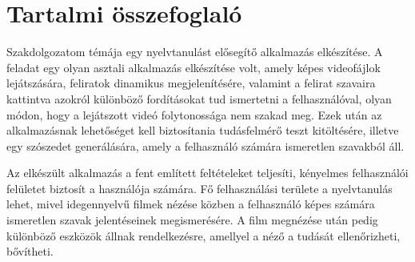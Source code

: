 \chapter*{Tartalmi összefoglaló}

Szakdolgozatom témája egy nyelvtanulást elősegítő alkalmazás elkészítése. A feladat egy olyan asztali alkalmazás elkészítése volt, amely képes videofájlok lejátszására, feliratok dinamikus megjelenítésére, valamint a felirat szavaira kattintva azokról különböző fordításokat tud ismertetni a felhasználóval, olyan módon, hogy a lejátszott videó folytonossága nem szakad meg. Ezek után az alkalmazásnak lehetőséget kell biztosítania tudásfelmérő teszt kitöltésére, illetve egy szószedet generálására, amely a felhasználó számára ismeretlen szavakból áll. 

Az elkészült alkalmazás a fent említett feltételeket teljesíti, kényelmes felhasználói felületet biztosít a használója számára. Fő felhasználási területe a nyelvtanulás lehet, mivel idegennyelvű filmek nézése közben a felhasználó képes számára ismeretlen szavak jelentéseinek megismerésére. A film megnézése után pedig különböző eszközök állnak rendelkezésre, amellyel a néző a tudását ellenőrizheti, bővítheti.